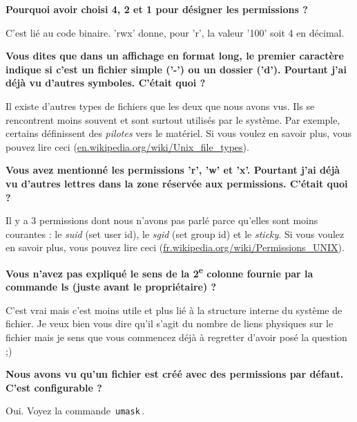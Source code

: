 \documentclass[a4paper,11pt]{style-esi/td}
\begin{document}
\par
\textbf{Pourquoi avoir choisi 4, 2 et 1 pour désigner les permissions ?}
\par

C'est lié au code binaire. 'rwx' donne, pour 'r', la valeur '100' soit 4 en décimal.  

\par
\textbf{Vous dites que dans un affichage en format long, 
	le premier caractère indique si c'est un fichier simple ('-') ou un dossier ('d'). 
	Pourtant j'ai déjà vu d'autres symboles. C'était quoi ?
}
\par

Il existe d'autres types de fichiers que les deux que nous avons vus. 
Ils se rencontrent moins souvent et sont surtout utilisés par le système.
Par exemple, certains définissent des \textit{pilotes} vers le matériel. 
Si vous voulez en savoir plus, vous pouvez lire
ceci (\url{en.wikipedia.org/wiki/Unix\_file\_types}).  

\par
\textbf{Vous avez mentionné les permissions 'r', 'w' et 'x'. 
	Pourtant j'ai déjà vu d'autres lettres dans la zone réservée aux permissions. 
	C'était quoi ?
}
\par

Il y a 3 permissions dont nous n'avons pas parlé parce qu'elles sont moins courantes : 
le \textit{suid} (set user id), 
le \textit{sgid} (set group id) 
et le \textit{sticky}. 
Si vous voulez en savoir plus, vous pouvez lire   
ceci (\url{fr.wikipedia.org/wiki/Permissions\_UNIX}).  

\par
\textbf{Vous n'avez pas expliqué le sens de la 2\textsuperscript{e} colonne 
	fournie par la commande ls (juste avant le propriétaire) ?
}
\par

C'est vrai mais c'est moins utile et plus lié à la structure interne du système de fichier. 
Je veux bien vous dire qu'il s'agit du nombre de liens physiques sur le fichier 
mais je sens que vous commencez déjà à regretter d'avoir posé la question ;)  

\par
\textbf{Nous avons vu qu'un fichier est créé avec des permissions par défaut. 
	C'est configurable ?
}
\par

Oui. Voyez la commande \,\verb|umask|\,.  

\par
\end{document}
